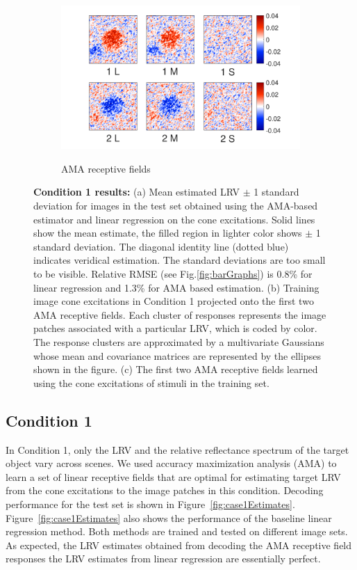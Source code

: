 \documentclass{jov}
\begin{document}
\begin{figure}
\begin{subfigure}[b]{0.26 \textwidth}
        \label{fig:case1RFResponse}
    \end{subfigure}
    \begin{subfigure}[b]{0.4 \textwidth}
	\caption{AMA receptive fields}
	\includegraphics[width=1.0\textwidth, trim={0.2cm -0.cm 0 0.3cm}]{../FiguresDraft5/Figure10/Figure10_c.pdf}
	\label{fig:case1RFs}
    \end{subfigure}   
    \caption{{\bf Condition 1 results:} (a) Mean estimated LRV $\pm$ 1 standard deviation for images in the test set obtained using the AMA-based estimator and linear regression on the cone excitations. Solid lines show the mean estimate, the filled region in lighter color shows $\pm$ 1 standard deviation. The diagonal identity line (dotted blue) indicates veridical estimation. The standard deviations are too small to be visible. Relative RMSE (see Fig.\ref{fig:barGraphs}) is 0.8\% for linear regression and 1.3\%  for AMA based estimation. (b) Training image cone excitations in Condition 1 projected onto the first two AMA receptive fields. Each cluster of responses represents the image patches associated with a particular LRV, which is coded by color. The response clusters are approximated by a multivariate Gaussians whose mean and covariance matrices are represented by the ellipses shown in the figure. (c) The first two AMA receptive fields learned using the cone excitations of stimuli in the training set.}
\label{fig:Condition1}
\end{figure}

\subsection{Condition 1}

In Condition 1, only the LRV and the relative reflectance spectrum of the target object vary across scenes.
We used accuracy maximization analysis (AMA) to learn a set of linear receptive fields that are optimal for estimating target LRV from the cone excitations to the image patches in this condition. 
Decoding performance for the test set is shown in Figure~\ref{fig:case1Estimates}. 
Figure~\ref{fig:case1Estimates} also shows the performance of the baseline linear regression method. 
Both methods are trained and tested on different image sets.
As expected, the LRV estimates obtained from decoding the AMA receptive field responses the LRV estimates from linear regression are essentially perfect.
\end{document}
